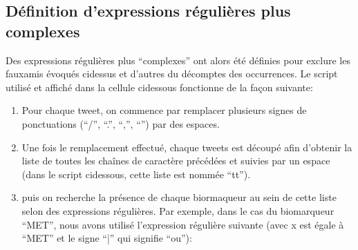 \documentclass[letterpaper,10pt,english]{jupyterBook}
\begin{document}
\subsection{Définition d’expressions régulières plus complexes}
\label{\detokenize{read_sm:definition-d-expressions-regulieres-plus-complexes}}
\sphinxAtStartPar
Des expressions régulières plus “complexes” ont alors été définies pour exclure les faux\sphinxhyphen{}amis évoqués ci\sphinxhyphen{}dessus et d’autres du décomptes des occurrences. Le script utilisé et affiché dans la cellule ci\sphinxhyphen{}dessous fonctionne de la façon suivante:
\begin{enumerate}
%
\item {} 
\sphinxAtStartPar
Pour chaque tweet, on commence par remplacer plusieurs signes de ponctuations (“/”, “.”, “,”, “\sphinxhyphen{}”) par des espaces.

\item {} 
\sphinxAtStartPar
Une fois le remplacement effectué, chaque tweets est découpé afin d’obtenir la liste de toutes les chaînes de caractère précédées et suivies par un espace (dans le script ci\sphinxhyphen{}dessous, cette liste est nommée “tt”).

\item {} 
\sphinxAtStartPar
puis on recherche la présence de chaque biormaqueur au sein de cette liste selon des expressions régulières. Par exemple, dans le cas du biomarqueur “MET”, nous avons utilisé l’expression régulière suivante (avec x est égale à “MET” et le signe “|” qui signifie “ou”):

\end{enumerate}

\sphinxAtStartPar
{}
\end{document}
